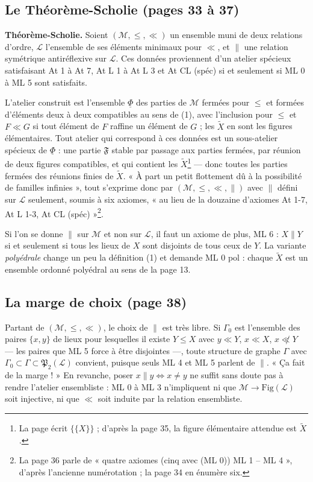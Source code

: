 \documentclass[11pt,a4paper]{article}
\begin{document}
\subsection*{Le Théorème-Scholie (pages 33 à 37)}

\textbf{Théorème-Scholie.} Soient $(\mathcal{M}, \leq, \ll)$ un ensemble muni de
deux relations d'ordre, $\mathcal{L}$ l'ensemble de ses éléments minimaux pour
$\ll$, et $\parallel$ une relation symétrique antiréflexive sur $\mathcal{L}$.
Ces données proviennent d'un atelier spécieux satisfaisant At 1 à At 7, At L 1 à
At L 3 et At CL (spéc) si et seulement si ML 0 à ML 5 sont satisfaits.

L'atelier construit est l'ensemble $\underline{\Phi}$ des parties de $\mathcal{M}$
fermées pour $\leq$ et formées d'éléments deux à deux compatibles au sens de (1),
avec l'inclusion pour $\leq$ et $F \ll G$ si tout élément de $F$ raffine un
élément de $G$ ; les $\widetilde{X}$ en sont les figures élémentaires. Tout
atelier qui correspond à ces données est un sous-atelier spécieux de
$\underline{\Phi}$ : une partie $\mathfrak{F}$ stable par passage aux parties
fermées, par réunion de deux figures compatibles, et qui contient les
$\widetilde{X}$\footnote{La page écrit $\{\{X\}\}$ ; d'après la page 35, la figure
élémentaire attendue est $\widetilde{X}$.} --- donc toutes les parties fermées des
réunions finies de $\widetilde{X}$. « À part un petit flottement dû à la
possibilité de familles infinies », tout s'exprime donc par $(\mathcal{M}, \leq,
\ll, \parallel)$ avec $\parallel$ défini sur $\mathcal{L}$ seulement, soumis à six
axiomes, « au lieu de la douzaine d'axiomes At 1-7, At L 1-3, At CL
(spéc) »\footnote{La page 36 parle de « quatre axiomes (cinq avec (ML 0)) ML 1
-- ML 4 », d'après l'ancienne numérotation ; la page 34 en énumère six.}.

Si l'on se donne $\parallel$ sur $\mathcal{M}$ et non sur $\mathcal{L}$, il faut un
axiome de plus, ML 6 : $X \parallel Y$ si et seulement si tous les lieux de $X$
sont disjoints de tous ceux de $Y$. La variante \emph{polyédrale} change un peu la
définition (1) et demande ML 0 pol : chaque $\widetilde{X}$ est un ensemble ordonné
polyédral au sens de la page 13.

\subsection*{La marge de choix (page 38)}

Partant de $(\mathcal{M}, \leq, \ll)$, le choix de $\parallel$ est très libre. Si
$\Gamma_{0}$ est l'ensemble des paires $\{x, y\}$ de lieux pour lesquelles il
existe $Y \leq X$ avec $y \ll Y$, $x \ll X$, $x \not\ll Y$ --- les paires que ML 5
force à être disjointes ---, toute structure de graphe $\Gamma$ avec $\Gamma_{0}
\subset \Gamma \subset \mathfrak{P}_{2}(\mathcal{L})$ convient, puisque seuls ML 4
et ML 5 parlent de $\parallel$. « Ça fait de la marge ! » En revanche, poser $x
\parallel y \iff x \neq y$ ne suffit sans doute pas à rendre l'atelier
ensembliste : ML 0 à ML 3 n'impliquent ni que $\mathcal{M} \to
\mathrm{Fig}(\mathcal{L})$ soit injective, ni que $\ll$ soit induite par la
relation ensembliste.
\end{document}
